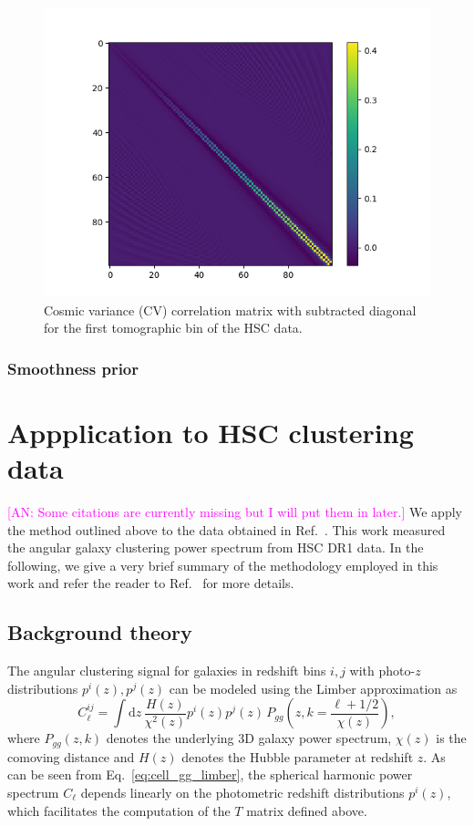 \documentclass[a4paper,11pt]{article}
\newcommand{\an}[1]{{\textcolor{magenta}{[AN: #1]}}}
\begin{document}
\begin{figure}[ht]
\centering  
\includegraphics[width=1.\textwidth]{./corr_CV_0.png}
\caption{Cosmic variance (CV) correlation matrix with subtracted diagonal for the first tomographic bin of the HSC data.} 
\label{fig:CV}
\end{figure}


\subsubsection{Smoothness prior}


  





\section{Appplication to HSC clustering data}
\label{sec:hsc}
\an{Some citations are currently missing but I will put them in later.}
We apply the method outlined above to the data obtained in Ref.~\cite{1912.08209}. This work measured the angular galaxy clustering power spectrum from HSC DR1 data. In the following, we give a very brief summary of the methodology employed in this work and refer the reader to Ref.~\cite{1912.08209} for more details.
\subsection{Background theory}
The angular clustering signal for galaxies in redshift bins $i, j$ with photo-$z$ distributions $p^i(z), p^j(z)$ can be modeled using the Limber approximation as \cite{1953ApJ...117..134L, 1992ApJ...388..272K, Kaiser:1998}
    \begin{equation}\label{eq:cell_gg_limber}
      C^{ij}_\ell = \int \mathrm{d}z\,\frac{H(z)}{\chi^2(z)} p^i(z)p^j(z)\,P_{gg}\left(z,k=\frac{\ell+1/2}{\chi(z)}\right),
    \end{equation}
where $P_{gg}(z,k)$ denotes the underlying 3D galaxy power spectrum, $\chi(z)$ is the comoving distance and $H(z)$ denotes the Hubble parameter at redshift $z$. As can be seen from Eq.~\ref{eq:cell_gg_limber}, the spherical harmonic power spectrum $C_{\ell}$ depends linearly on the photometric redshift distributions $p^i(z)$, which facilitates the computation of the $T$ matrix defined above. 
\end{document}
